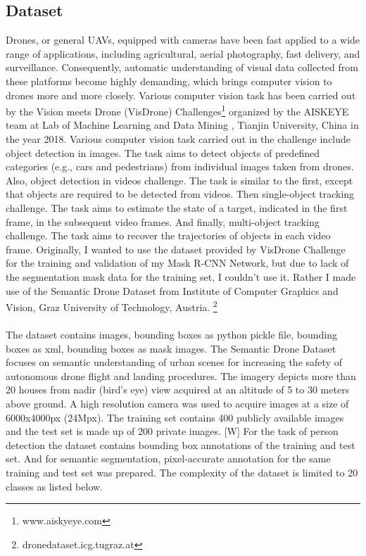 \subsection{Dataset}
Drones, or general UAVs, equipped with cameras have been fast applied to a wide range of applications, including agricultural, aerial photography, fast delivery, and surveillance. Consequently, automatic understanding of visual data collected from these platforms become highly demanding, which brings computer vision to drones more and more closely. 
Various computer vision task has been carried out by the Vision meets Drone (VisDrone) Challenges\footnote{www.aiskyeye.com}
organized  by the AISKEYE team at Lab of Machine Learning and Data Mining , Tianjin University, China in the year 2018.
Various computer vision task carried out in the challenge include object detection in images. The task aims to detect objects of predefined categories (e.g., cars and pedestrians) from individual images taken from drones. Also, object detection in videos challenge. The task is similar to the first, except that objects are required to be detected from videos. Then single-object tracking challenge. The task aims to estimate the state of a target, indicated in the first frame, in the subsequent video frames. And finally, multi-object tracking challenge. The task aims to recover the trajectories of objects in each video frame.
Originally, I wanted to use the dataset provided by VisDrone Challenge for the training and validation of my Mask R-CNN Network, but due to lack of the segmentation mask data for the training set, I couldn’t use it.
Rather I made use of the Semantic Drone Dataset from Institute of Computer Graphics and Vision, Graz University of Technology, Austria. \footnote{dronedataset.icg.tugraz.at}

\paragraph{}
The dataset contains images, bounding boxes as python pickle file, bounding boxes as xml, bounding boxes as mask images. The Semantic Drone Dataset focuses on semantic understanding of urban scenes for increasing the safety of autonomous drone flight and landing procedures. The imagery depicts  more than 20 houses from nadir (bird's eye) view acquired at an altitude of 5 to 30 meters above ground. A high resolution camera was used to acquire images at a size of 6000x4000px (24Mpx). The training set contains 400 publicly available images and the test set is made up of 200 private images. [W]
For the task of person detection the dataset contains bounding box annotations of the training and test set. And for semantic segmentation, pixel-accurate annotation for the same training and test set was prepared. The complexity of the dataset is limited to 20 classes as listed below.

